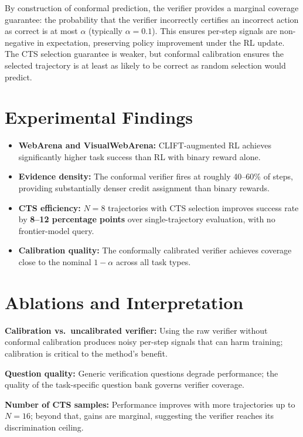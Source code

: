\documentclass[10pt,twocolumn]{article}
\begin{document}
By construction of conformal prediction, the verifier provides a marginal
coverage guarantee: the probability that the verifier incorrectly certifies an
incorrect action as correct is at most $\alpha$ (typically $\alpha = 0.1$).
This ensures per-step signals are non-negative in expectation, preserving
policy improvement under the RL update. The CTS selection guarantee is weaker,
but conformal calibration ensures the selected trajectory is at least as
likely to be correct as random selection would predict.

\section{Experimental Findings}

\begin{itemize}[itemsep=2pt,parsep=0pt]
  \item \textbf{WebArena and VisualWebArena:} CLIFT-augmented RL achieves
    significantly higher task success than RL with binary reward alone.
  \item \textbf{Evidence density:} The conformal verifier fires at roughly
    40--60\% of steps, providing substantially denser credit assignment than
    binary rewards.
  \item \textbf{CTS efficiency:} $N{=}8$ trajectories with CTS selection
    improves success rate by \textbf{8--12 percentage points} over
    single-trajectory evaluation, with no frontier-model query.
  \item \textbf{Calibration quality:} The conformally calibrated verifier
    achieves coverage close to the nominal $1 - \alpha$ across all task types.
\end{itemize}

\section{Ablations and Interpretation}

\textbf{Calibration vs.\ uncalibrated verifier:} Using the raw verifier
without conformal calibration produces noisy per-step signals that can harm
training; calibration is critical to the method's benefit.

\textbf{Question quality:} Generic verification questions degrade performance;
the quality of the task-specific question bank governs verifier coverage.

\textbf{Number of CTS samples:} Performance improves with more trajectories
up to $N{=}16$; beyond that, gains are marginal, suggesting the verifier
reaches its discrimination ceiling.
\end{document}
